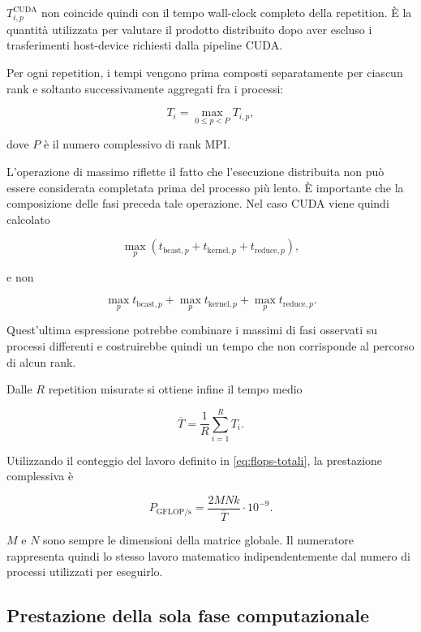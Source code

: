 $T^{\mathrm{CUDA}}_{i,p}$ non coincide quindi con il tempo wall-clock
completo della repetition. È la quantità utilizzata per valutare il
prodotto distribuito dopo aver escluso i trasferimenti host-device richiesti
dalla pipeline CUDA.

Per ogni repetition, i tempi vengono prima composti separatamente per
ciascun rank e soltanto successivamente aggregati fra i processi:

\begin{equation}
T_i
=
\max_{0\le p<P} T_{i,p},
\label{eq:t-performance-repetition}
\end{equation}

dove $P$ è il numero complessivo di rank MPI.

L'operazione di massimo riflette il fatto che l'esecuzione distribuita non
può essere considerata completata prima del processo più lento.
È importante che la composizione delle fasi preceda tale operazione. Nel
caso CUDA viene quindi calcolato

\[
\max_p
\left(
t_{\mathrm{bcast},p}
+
t_{\mathrm{kernel},p}
+
t_{\mathrm{reduce},p}
\right),
\]

e non

\[
\max_p t_{\mathrm{bcast},p}
+
\max_p t_{\mathrm{kernel},p}
+
\max_p t_{\mathrm{reduce},p}.
\]

Quest'ultima espressione potrebbe combinare i massimi di fasi osservati su
processi differenti e costruirebbe quindi un tempo che non corrisponde al
percorso di alcun rank.

Dalle $R$ repetition misurate si ottiene infine il tempo medio

\begin{equation}
\overline{T}
=
\frac{1}{R}
\sum_{i=1}^{R} T_i .
\label{eq:t-performance-mean}
\end{equation}

Utilizzando il conteggio del lavoro definito in
\cref{eq:flops-totali}, la prestazione complessiva è

\begin{equation}
P_{\mathrm{GFLOP/s}}
=
\frac{2MNk}{\overline{T}}\cdot10^{-9}.
\label{eq:gflops-performance}
\end{equation}

$M$ e $N$ sono sempre le dimensioni della matrice globale. Il numeratore
rappresenta quindi lo stesso lavoro matematico indipendentemente dal numero
di processi utilizzati per eseguirlo.

\subsection{Prestazione della sola fase computazionale}


